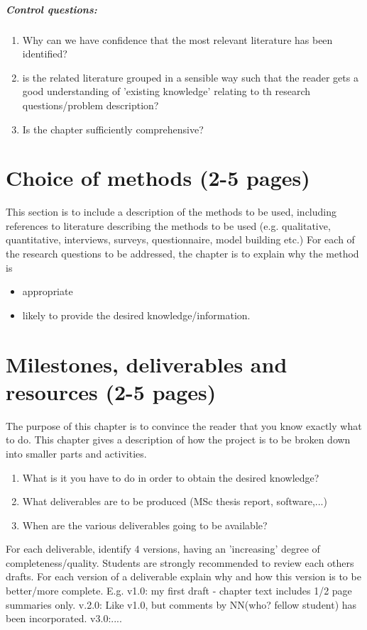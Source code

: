 \documentclass[informationsecurity]{gucmasterproject}
\begin{document}
\paragraph{Control questions:}
\begin{enumerate}
\item Why can we have confidence that the most relevant literature has been identified?
\item is the related literature grouped in a sensible way such that the reader gets a good understanding of 'existing knowledge' relating to th research questions/problem description?
\item Is the chapter sufficiently comprehensive?
\end{enumerate}

\chapter{Choice of methods (2-5 pages)}
This section is to include a description of the methods to be used,
including references to literature describing the methods to be used
(e.g. qualitative, quantitative, interviews, surveys,
questionnaire,  model building etc.)
For each of the research questions to be addressed,
the chapter is to explain why the method is
\begin{itemize}
\item appropriate
\item likely to provide the desired knowledge/information.
\end{itemize}

\chapter{Milestones, deliverables and resources (2-5 pages)}
The purpose of this chapter is to convince the reader that you know exactly what to do.
This chapter gives a description of how the project is to be
broken down into smaller parts and activities.
\begin{enumerate}
\item  What is it you have to do in order to obtain the desired knowledge?
\item  What deliverables are to be produced (MSc thesis report, software,...)
\item  When are the various deliverables going to be available?
\end{enumerate}

For each deliverable, identify 4 versions, having an
'increasing' degree of completeness/quality.
Students are strongly recommended to review each others drafts.
For each version of a deliverable explain why and how this version is to
be better/more complete.  E.g. v1.0: my first draft -
chapter text includes 1/2 page summaries only.
v.2.0: Like v1.0, but comments by NN(who? fellow student)
has been incorporated. v3.0:....
\end{document}
